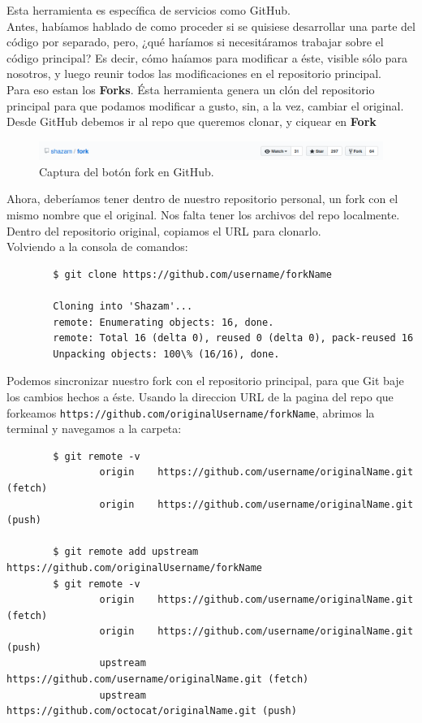 \documentclass[a4paper, 12pt]{article}
\begin{document}
Esta herramienta es específica de servicios como GitHub.\\
Antes, habíamos hablado de como proceder si se quisiese desarrollar una parte del código por separado, pero, ¿qué haríamos si necesitáramos trabajar sobre el código principal? Es decir, cómo haíamos para modificar a éste, visible sólo para nosotros, y luego reunir todos las modificaciones en el repositorio principal.\\

Para eso estan los \textbf{Forks}. Ésta herramienta genera un clón del repositorio principal para que podamos modificar a gusto, sin, a la vez, cambiar el original.\\

Desde GitHub debemos ir al repo que queremos clonar, y ciquear en \textbf{Fork}\\

\begin{figure}[h!]

\centering
\includegraphics[scale=0.4]{fork.png}
\caption{\small Captura del botón fork en GitHub.}

\end{figure}

Ahora, deberíamos tener dentro de nuestro repositorio personal, un fork con el mismo nombre que el original. Nos falta tener los archivos del repo localmente.\\
Dentro del repositorio original, copiamos el URL para clonarlo.\\
Volviendo a la consola de comandos:

\begin{verbatim}
        $ git clone https://github.com/username/forkName

        Cloning into 'Shazam'...
        remote: Enumerating objects: 16, done.
        remote: Total 16 (delta 0), reused 0 (delta 0), pack-reused 16
        Unpacking objects: 100\% (16/16), done.
\end{verbatim}

Podemos sincronizar nuestro fork con el repositorio principal, para que Git baje los cambios hechos a éste.
Usando la direccion URL de la pagina del repo que forkeamos \texttt{https://github.com/originalUsername/forkName}, abrimos la terminal y navegamos a la carpeta:

\begin{verbatim}
        $ git remote -v
                origin    https://github.com/username/originalName.git (fetch)
                origin    https://github.com/username/originalName.git (push)
	
        $ git remote add upstream https://github.com/originalUsername/forkName
        $ git remote -v
                origin    https://github.com/username/originalName.git (fetch)
                origin    https://github.com/username/originalName.git (push)
                upstream    https://github.com/username/originalName.git (fetch)
                upstream    https://github.com/octocat/originalName.git (push)
\end{verbatim}
\end{document}
